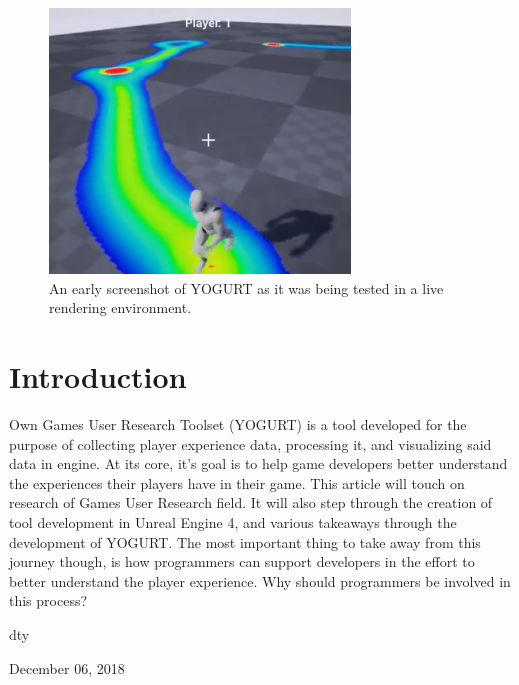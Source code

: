 \documentclass[journal]{IEEEtran}
\begin{document}
\begin{figure}[ht]
\includegraphics[width=8cm]{"testing_live"}
\caption{An early screenshot of YOGURT as it was being tested in a live rendering environment.}
\label{testingLive}
\end{figure}

\section{Introduction}
% 
% 
% 
% 
 Own Games User Research Toolset (YOGURT) is a tool developed for the purpose of collecting player experience data, processing it, and visualizing said data in engine. At its core, it's goal is to help game developers better understand the experiences their players have in their game. This article will touch on research of Games User Research field. It will also step through the creation of tool development in Unreal Engine 4, and various takeaways through the development of YOGURT. The most important thing to take away from this journey though, is how programmers can support developers in the effort to better understand the player experience. Why should programmers be involved in this process?

\hfill dty
 
\hfill December 06, 2018
\end{document}
